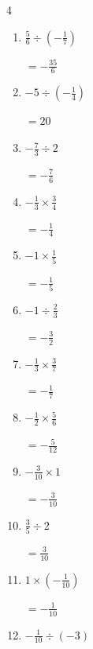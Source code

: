 \begin{multicols}{4}
\begin{enumerate}
        $\displaystyle =60$

  \item $\displaystyle \frac{5}{6}\div{}\left(-\frac{1}{7}\right)$

        $\displaystyle =-\frac{35}{6}$

  \item $\displaystyle -5\div{}\left(-\frac{1}{4}\right)$

        $\displaystyle =20$

  \item $\displaystyle -\frac{7}{3}\div{}2$

        $\displaystyle =-\frac{7}{6}$

  \item $\displaystyle -\frac{1}{3}\times{}\frac{3}{4}$

        $\displaystyle =-\frac{1}{4}$

  \item $\displaystyle -1\times{}\frac{1}{5}$

        $\displaystyle =-\frac{1}{5}$

\columnbreak %

  \item $\displaystyle -1\div{}\frac{2}{3}$

        $\displaystyle =-\frac{3}{2}$

  \item $\displaystyle -\frac{1}{3}\times{}\frac{3}{7}$

        $\displaystyle =-\frac{1}{7}$

  \item $\displaystyle -\frac{1}{2}\times{}\frac{5}{6}$

        $\displaystyle =-\frac{5}{12}$

  \item $\displaystyle -\frac{3}{10}\times{}1$

        $\displaystyle =-\frac{3}{10}$

  \item $\displaystyle \frac{3}{5}\div{}2$

        $\displaystyle =\frac{3}{10}$

  \item $\displaystyle 1\times{}\left(-\frac{1}{10}\right)$

        $\displaystyle =-\frac{1}{10}$

  \item $\displaystyle -\frac{1}{10}\div{}\left(-3\right)$


\end{enumerate}
\end{multicols}
